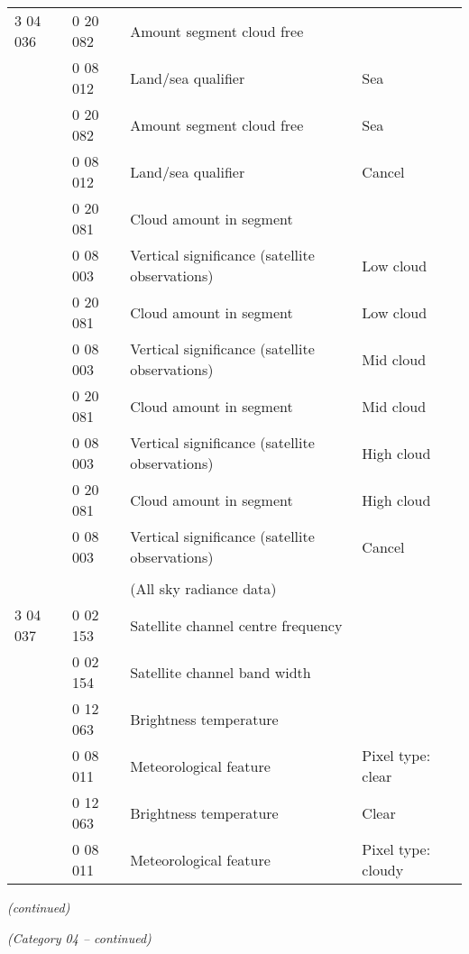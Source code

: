 \begin{longtable}[]{@{}llll@{}}
3 04 036 & 0 20 082 & Amount segment cloud free &\tabularnewline
& 0 08 012 & Land/sea qualifier & Sea\tabularnewline
& 0 20 082 & Amount segment cloud free & Sea\tabularnewline
& 0 08 012 & Land/sea qualifier & Cancel\tabularnewline
& 0 20 081 & Cloud amount in segment &\tabularnewline
& 0 08 003 & Vertical significance (satellite observations) & Low cloud\tabularnewline
& 0 20 081 & Cloud amount in segment & Low cloud\tabularnewline
& 0 08 003 & Vertical significance (satellite observations) & Mid cloud\tabularnewline
& 0 20 081 & Cloud amount in segment & Mid cloud\tabularnewline
& 0 08 003 & Vertical significance (satellite observations) & High cloud\tabularnewline
& 0 20 081 & Cloud amount in segment & High cloud\tabularnewline
& 0 08 003 & Vertical significance (satellite observations) & Cancel\tabularnewline
& & &\tabularnewline
& & (All sky radiance data) &\tabularnewline
3 04 037 & 0 02 153 & Satellite channel centre frequency &\tabularnewline
& 0 02 154 & Satellite channel band width &\tabularnewline
& 0 12 063 & Brightness temperature &\tabularnewline
& 0 08 011 & Meteorological feature & Pixel type: clear\tabularnewline
& 0 12 063 & Brightness temperature & Clear\tabularnewline
& 0 08 011 & Meteorological feature & Pixel type: cloudy\tabularnewline
\bottomrule
\end{longtable}

\emph{(continued)}

\emph{(Category 04 -- continued)}

